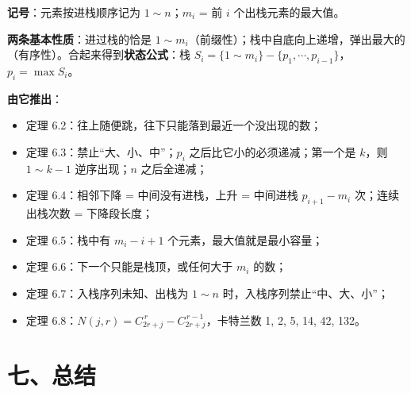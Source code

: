 \documentclass[10.5pt,a4paper,oneside]{article}
\providecommand{\tightlist}{\setlength{\itemsep}{2pt}\setlength{\parskip}{0pt}}
\newcommand{\tocback}{\par\vspace{-3pt}{\hfill\footnotesize\hyperlink{toc}{\textcolor{wdgray}{\ensuremath{\uparrow}\,回到目录}}}\par\vspace{-4pt}}
\begin{document}
\begin{summarybox}

\textbf{记号}：元素按进栈顺序记为 \(1\sim n\)；\(m_i\) = 前 \(i\)
个出栈元素的最大值。

\textbf{两条基本性质}：进过栈的恰是
\(1\sim m_i\)（前缀性）；栈中自底向上递增，弹出最大的（有序性）。合起来得到\textbf{状态公式}：栈
\(S_i=\{1\sim m_i\}-\{p_1,\cdots,p_{i-1}\}\)，\(p_i=\max S_i\)。

\textbf{由它推出}：

\begin{itemize}
\tightlist
\item
  定理 6.2：往上随便跳，往下只能落到最近一个没出现的数；
\item
  定理 6.3：禁止“大、小、中”；\(p_i\) 之后比它小的必须递减；第一个是
  \(k\)，则 \(1\sim k-1\) 逆序出现；\(n\) 之后全递减；
\item
  定理 6.4：相邻下降 = 中间没有进栈，上升 = 中间进栈 \(p_{i+1}-m_i\)
  次；连续出栈次数 = 下降段长度；
\item
  定理 6.5：栈中有 \(m_i-i+1\) 个元素，最大值就是最小容量；
\item
  定理 6.6：下一个只能是栈顶，或任何大于 \(m_i\) 的数；
\item
  定理 6.7：入栈序列未知、出栈为 \(1\sim n\)
  时，入栈序列禁止“中、大、小”；
\item
  定理 6.8：\(N(j,r)=C_{2r+j}^{\,r}-C_{2r+j}^{\,r-1}\)，卡特兰数 1, 2,
  5, 14, 42, 132。
\end{itemize}

\end{summarybox}

\newpage

\hypertarget{ux4e03ux603bux7ed3}{%
\section{七、总结}\label{ux4e03ux603bux7ed3}}

\tocback
\end{document}
